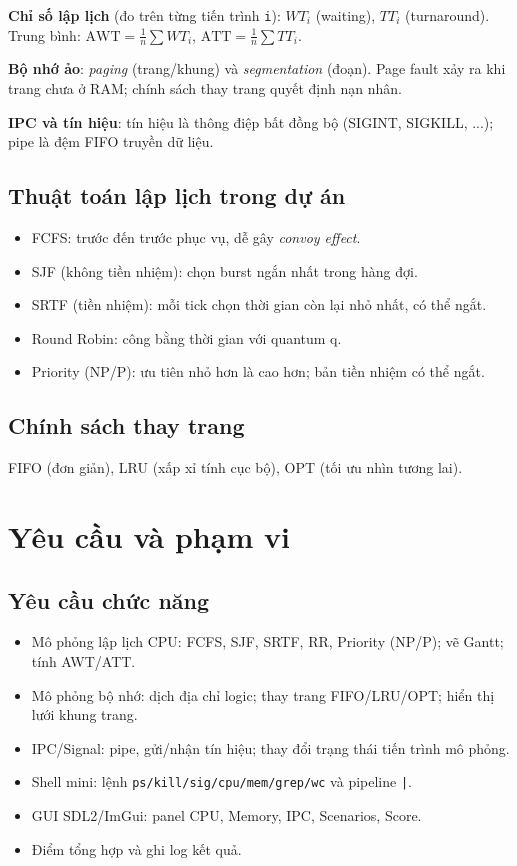 \documentclass[12pt,a4paper]{report}
\begin{document}
\textbf{Chỉ số lập lịch} (đo trên từng tiến trình \texttt{i}): \(WT_i\) (waiting), \(TT_i\) (turnaround). Trung bình: \(\mathrm{AWT}=\frac{1}{n}\sum WT_i\), \(\mathrm{ATT}=\frac{1}{n}\sum TT_i\).

\textbf{Bộ nhớ ảo}: \textit{paging} (trang/khung) và \textit{segmentation} (đoạn). Page fault xảy ra khi trang chưa ở RAM; chính sách thay trang quyết định nạn nhân.

\textbf{IPC và tín hiệu}: tín hiệu là thông điệp bất đồng bộ (SIGINT, SIGKILL, ...); pipe là đệm FIFO truyền dữ liệu.

\section{Thuật toán lập lịch trong dự án}
\begin{itemize}
  \item FCFS: trước đến trước phục vụ, dễ gây \textit{convoy effect}.
  \item SJF (không tiền nhiệm): chọn burst ngắn nhất trong hàng đợi.
  \item SRTF (tiền nhiệm): mỗi tick chọn thời gian còn lại nhỏ nhất, có thể ngắt.
  \item Round Robin: công bằng thời gian với quantum q.
  \item Priority (NP/P): ưu tiên nhỏ hơn là cao hơn; bản tiền nhiệm có thể ngắt.
\end{itemize}

\section{Chính sách thay trang}
FIFO (đơn giản), LRU (xấp xỉ tính cục bộ), OPT (tối ưu nhìn tương lai).

\chapter{Yêu cầu và phạm vi}
\section{Yêu cầu chức năng}
\begin{itemize}
  \item Mô phỏng lập lịch CPU: FCFS, SJF, SRTF, RR, Priority (NP/P); vẽ Gantt; tính AWT/ATT.
  \item Mô phỏng bộ nhớ: dịch địa chỉ logic; thay trang FIFO/LRU/OPT; hiển thị lưới khung trang.
  \item IPC/Signal: pipe, gửi/nhận tín hiệu; thay đổi trạng thái tiến trình mô phỏng.
  \item Shell mini: lệnh \verb|ps/kill/sig/cpu/mem/grep/wc| và pipeline \verb+|+.
  \item GUI SDL2/ImGui: panel CPU, Memory, IPC, Scenarios, Score.
  \item Điểm tổng hợp và ghi log kết quả.
\end{itemize}
\end{document}
